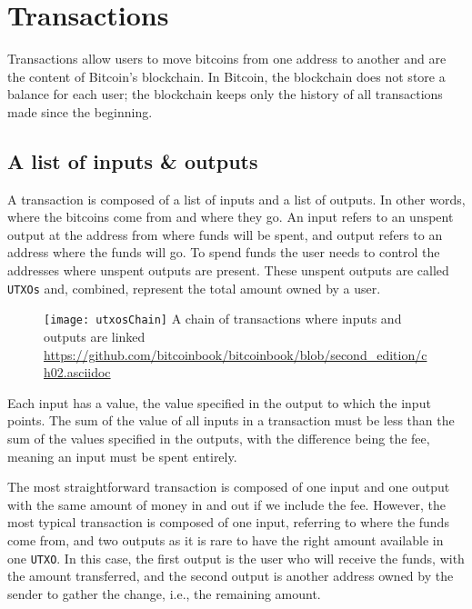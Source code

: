 \section{Transactions}

Transactions allow users to move bitcoins from one address to another and are
the content of  Bitcoin's blockchain. In Bitcoin, the blockchain does
not store a balance for each user; the blockchain keeps only the history of all
transactions made since the beginning.

\subsection{A list of inputs \& outputs}

A transaction is composed of a list of inputs and a list of outputs. In other
words, where the bitcoins come from and where they go. An input refers to an
unspent output at the address from where funds will be spent, and output
refers to an address where the funds will go.  To spend funds the user needs
to control the addresses where unspent outputs are present. These unspent outputs are
called \texttt{UTXOs} and, combined, represent the total amount owned by a user.

\begin{figure}[H]
	\centering
	\texttt{[image: utxosChain]}
  {A chain of transactions where inputs and outputs are linked}
	{\url{https://github.com/bitcoinbook/bitcoinbook/blob/second_edition/ch02.asciidoc}}
	\label{fig:utxosChain}
\end{figure}

Each input has a value, the value specified in the output to which
the input points. The sum of the value of all inputs in a transaction must be less than the
sum of the values specified in the outputs, with the difference being the fee, meaning an input must be spent entirely.

The most straightforward transaction is composed of one input and one output
with the same amount of money in and out if we include the fee. However, the most typical transaction
is composed of one input, referring to where the funds come from, and two
outputs as it is rare to have the right amount available in one
\texttt{UTXO}. In this case, the first output is the user who will receive the funds, with
the amount transferred, and the second output is another address owned by the
sender to gather the change, i.e., the remaining amount.

